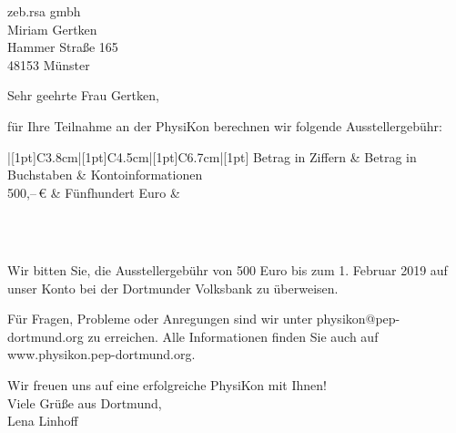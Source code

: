 \documentclass[
  pepbrief,
  fontsize=12pt,
  paper=a4,
  DIV=14,
  parskip=half,
  backaddress=false,
]{scrlttr2}
\author{Lena Linhoff}
\begin{document}
\begin{letter}{%
  zeb.rsa gmbh\\
  Miriam Gertken\\
  Hammer Straße 165\\
  48153 Münster

}
\opening{Sehr geehrte Frau Gertken,}
für Ihre Teilnahme an der PhysiKon berechnen wir folgende Ausstellergebühr:

\renewcommand{\arraystretch}{1.2}
\begin{center}
  \bfseries\scshape
	\begin{tabu}{|[1pt]C{3.8cm}|[1pt]C{4.5cm}|[1pt]C{6.7cm}|[1pt]}
		\tabucline[1pt]{-}
		 Betrag in Ziffern	&	Betrag in Buchstaben & Kontoinformationen\\
		\tabucline[1pt]{-}
    500,–\,€ & \normalfont Fünfhundert Euro & \normalfont \begin{tabular}{@{}c@{}}\end{tabular}\\
		\tabucline[1pt]{-}
	\end{tabu}
\end{center}
Wir bitten Sie, die Ausstellergebühr von 500 Euro bis zum 1. Februar 2019 auf unser Konto bei der Dortmunder Volksbank zu überweisen.

Für Fragen, Probleme oder Anregungen sind wir unter physikon@pep-dortmund.org zu erreichen. Alle Informationen finden Sie auch auf www.physikon.pep-dortmund.org.

Wir freuen uns auf eine erfolgreiche PhysiKon mit Ihnen!\\

Viele Grüße aus Dortmund,\\


Lena Linhoff

\end{letter}
\end{document}
